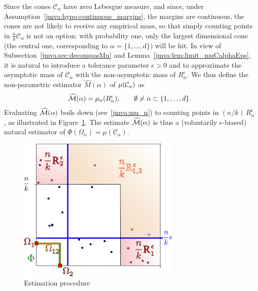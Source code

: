  Since the cones $\mathcal{C}_\alpha$ have zero Lebesgue measure, 
and since, under Assumption~\ref{jmva:hypo:continuous_margins}, the margins are
continuous, the cones  are not likely to receive any empirical mass, 
 so that  simply counting points in $\frac{n}{k}\mathcal{C}_\alpha$ is not an
option: with probability one, only
the largest dimensional cone (the central one, corresponding to
$\alpha= \{1,\ldots,d\})$ will be hit. 
%
In view of Subsection~\ref{jmva:sec:decomposMu} and
Lemma~\ref{jmva:lem:limit_muCalphaEps}, 
 it is natural to introduce a 
tolerance parameter $\epsilon>0$ and to approximate the asymptotic mass
of $\mathcal{C}_\alpha$ with the non-asymptotic mass of
$R_\alpha^\epsilon$. We thus define the non-parametric estimator $\widehat{M}(\alpha)$ of
$\mu(\mathcal{C}_\alpha)$ as
\begin{align}
\label{jmva:heuristic_mu_n}
\hatmass(\alpha) = \mu_n(R_\alpha^\epsilon), \qquad
\emptyset\neq\alpha\subset\dd.  %
\end{align}
Evaluating  $\widehat{\mathcal{M}}(\alpha)$  boils down (see~\eqref{jmva:mu_n})
to counting points in $(n/k)\,R_{\alpha}^{\epsilon}$, as illustrated in Figure~\ref{jmva:estimation_rect}. The estimate $\widehat{\mathcal{M}}(\alpha)$ is thus a (voluntarily
$\epsilon$-biased) natural estimator of $\Phi(\Omega_\alpha) = \mu(\mathcal{C}_\alpha)$.
\begin{figure}[!ht]
  \centering
  \includegraphics[width = 0.7\textwidth]{fig_source/representation2D_nk_rect.png}
  \caption{Estimation procedure}
  \label{jmva:estimation_rect}
\end{figure}


